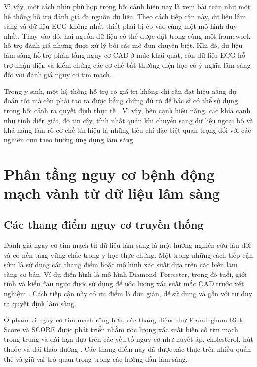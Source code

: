 \blocksep

Vì vậy, một cách nhìn phù hợp trong bối cảnh hiện nay là xem bài toán như một hệ thống hỗ trợ đánh giá đa nguồn dữ liệu. Theo cách tiếp cận này, dữ liệu lâm sàng và dữ liệu ECG không nhất thiết phải bị ép vào cùng một mô hình duy nhất. Thay vào đó, hai nguồn dữ liệu có thể được đặt trong cùng một framework hỗ trợ đánh giá nhưng được xử lý bởi các mô-đun chuyên biệt. Khi đó, dữ liệu lâm sàng hỗ trợ phân tầng nguy cơ CAD ở mức khái quát, còn dữ liệu ECG hỗ trợ nhận diện và kiểm chứng các cơ chế bất thường điện học có ý nghĩa lâm sàng đối với đánh giá nguy cơ tim mạch.

\blocksep

Trong y sinh, một hệ thống hỗ trợ có giá trị không chỉ cần đạt hiệu năng dự đoán tốt mà còn phải tạo ra được bằng chứng đủ rõ để bác sĩ có thể sử dụng trong bối cảnh ra quyết định thực tế \cite{Topol2019}. Vì vậy, bên cạnh hiệu năng, các khía cạnh như tính diễn giải, độ tin cậy, tính nhất quán khi chuyển sang dữ liệu ngoại bộ và khả năng làm rõ cơ chế tín hiệu là những tiêu chí đặc biệt quan trọng đối với các nghiên cứu theo hướng ứng dụng lâm sàng.

\blocksep

\section{Phân tầng nguy cơ bệnh động mạch vành từ dữ liệu lâm sàng}

\blocksep

\subsection{Các thang điểm nguy cơ truyền thống}

\blocksep

Đánh giá nguy cơ tim mạch từ dữ liệu lâm sàng là một hướng nghiên cứu lâu đời và có nền tảng vững chắc trong y học thực chứng. Một trong những cách tiếp cận sớm là sử dụng các thang điểm hoặc mô hình xác suất dựa trên các biến lâm sàng cơ bản. Ví dụ điển hình là mô hình Diamond--Forrester, trong đó tuổi, giới tính và kiểu đau ngực được sử dụng để ước lượng xác suất mắc CAD trước xét nghiệm \cite{Diamond1979}. Cách tiếp cận này có ưu điểm là đơn giản, dễ sử dụng và gần với tư duy ra quyết định lâm sàng.

\blocksep

Ở phạm vi nguy cơ tim mạch rộng hơn, các thang điểm như Framingham Risk Score và SCORE được phát triển nhằm ước lượng xác suất biến cố tim mạch trong trung và dài hạn dựa trên các yếu tố nguy cơ như huyết áp, cholesterol, hút thuốc và đái tháo đường \cite{DAgostino2008, Conroy2003}. Các thang điểm này đã được xác thực trên nhiều quần thể và giữ vai trò quan trọng trong các hướng dẫn lâm sàng.

